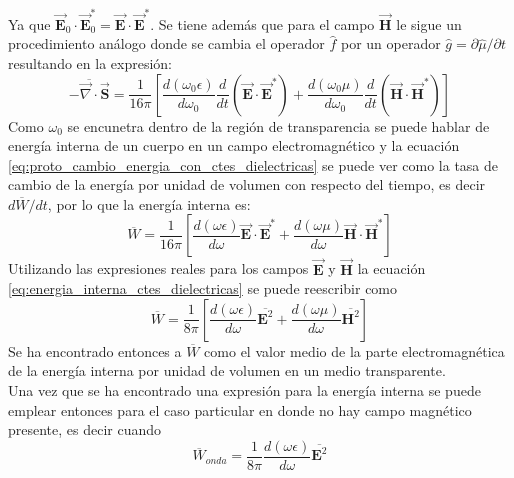 \documentclass[../tesis_main_file.tex]{subfiles}
\begin{document}
Ya que $\overrightarrow{\textbf{E}}_0\cdot \overrightarrow{\textbf{E}}_0^* = \overrightarrow{\textbf{E}}\cdot \overrightarrow{\textbf{E}}^*$. Se tiene además que para el campo $\overrightarrow{\textbf{H}}$ le sigue un procedimiento análogo donde se cambia el operador $\widehat{f}$ por un operador $\widehat{g}=\partial \widehat{\mu}/\partial t$ resultando en la expresión: 
\begin{equation}
\label{eq:proto_cambio_energia_con_ctes_dielectricas}\overline{-\overrightarrow{\nabla} \cdot \overrightarrow{\textbf{S}}} = \frac{1}{16\pi}\left[\frac{d(\omega_0 \epsilon)}{d\omega_0}\frac{d}{dt}\left(\overrightarrow{\textbf{E}}\cdot \overrightarrow{\textbf{E}}^*\right) + \frac{d(\omega_0 \mu)}{d\omega_0}\frac{d}{dt}\left(\overrightarrow{\textbf{H}}\cdot \overrightarrow{\textbf{H}}^*\right)\right]
\end{equation}
Como $\omega_0$ se encunetra dentro de la región de transparencia se puede hablar de energía interna de un cuerpo en un campo electromagnético y la ecuación \ref{eq:proto_cambio_energia_con_ctes_dielectricas} se puede ver como la tasa de cambio de la energía por unidad de volumen con respecto del tiempo, es decir $d\overline{W}/dt$, por lo que la energía interna es:
\begin{equation}
\label{eq:energia_interna_ctes_dielectricas}
\overline{W}=\frac{1}{16\pi}\left[\frac{d(\omega \epsilon)}{d\omega}\overrightarrow{\textbf{E}}\cdot \overrightarrow{\textbf{E}}^* + \frac{d(\omega \mu )}{d\omega}\overrightarrow{\textbf{H}}\cdot \overrightarrow{\textbf{H}}^*\right]
\end{equation}
Utilizando las expresiones reales para los campos $\overrightarrow{\textbf{E}}$ y $\overrightarrow{\textbf{H}}$ la ecuación \ref{eq:energia_interna_ctes_dielectricas} se puede reescribir como
\begin{equation}
\label{eq:energia_interna_electro_promedio_real}
\overline{W}=\frac{1}{8\pi}\left[\frac{d(\omega \epsilon)}{d\omega}\overline{\textbf{E}^2} + \frac{d(\omega \mu )}{d\omega}\overline{\textbf{H}^2}\right]
\end{equation}
Se ha encontrado entonces a $\overline{W}$ como el valor medio de la parte electromagnética de la energía interna por unidad de volumen en un medio transparente.\\
Una vez que se ha encontrado una expresión para la energía interna se puede emplear entonces para el caso particular en donde no hay campo magnético presente, es decir cuando
\begin{equation}
\overline{W}_{onda}= \frac{1}{8\pi}\frac{d(\omega \epsilon)}{d\omega}\overline{\textbf{E}^2}
\end{equation}
\end{document}
